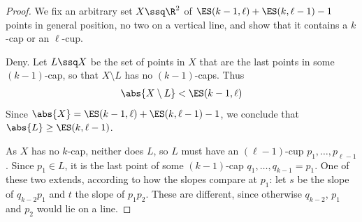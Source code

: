 \begin{proof}
    We fix an arbitrary set $X \ssq \R^2$ of $\ES(k - 1, \ell) + \ES(k, \ell - 1) - 1$ points in general position, no two on a vertical line, and show that it contains a $k$-cap or an $\ell$-cup.
    
    Deny. Let $L \ssq X$ be the set of points in $X$ that are the last points in some $(k - 1)$-cap, so that $X \setminus L$ has no $(k - 1)$-caps. Thus
    \begin{align*}
        \abs{X \setminus L} < \ES(k - 1, \ell)
    \end{align*}
    Since $\abs{X} = \ES(k - 1, \ell) + \ES(k, \ell - 1) - 1$, we conclude that $\abs{L} \geq \ES(k, \ell - 1)$.

    As $X$ has no $k$-cap, neither does $L$, so $L$ must have an $(\ell - 1)$-cup $p_1, \ldots, p_{\ell - 1}$. Since $p_1 \in L$, it is the last point of some $(k - 1)$-cap $q_1, \ldots, q_{k - 1} = p_1$. One of these two extends, according to how the slopes compare at $p_1$: let $s$ be the slope of $q_{k - 2} p_1$ and $t$ the slope of $p_1 p_2$. These are different, since otherwise $q_{k - 2}$, $p_1$ and $p_2$ would lie on a line.


\end{proof}
